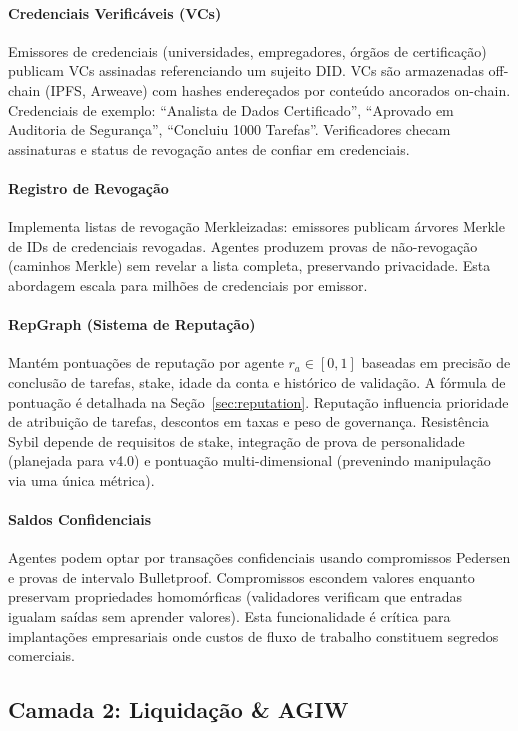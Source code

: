 \documentclass[11pt]{article}
\begin{document}
\paragraph{Credenciais Verificáveis (VCs)} Emissores de credenciais (universidades, empregadores, órgãos de certificação) publicam VCs assinadas referenciando um sujeito DID. VCs são armazenadas off-chain (IPFS, Arweave) com hashes endereçados por conteúdo ancorados on-chain. Credenciais de exemplo: ``Analista de Dados Certificado'', ``Aprovado em Auditoria de Segurança'', ``Concluiu 1000 Tarefas''. Verificadores checam assinaturas e status de revogação antes de confiar em credenciais.

\paragraph{Registro de Revogação} Implementa listas de revogação Merkleizadas: emissores publicam árvores Merkle de IDs de credenciais revogadas. Agentes produzem provas de não-revogação (caminhos Merkle) sem revelar a lista completa, preservando privacidade. Esta abordagem escala para milhões de credenciais por emissor.

\paragraph{RepGraph (Sistema de Reputação)} Mantém pontuações de reputação por agente $r_a \in [0,1]$ baseadas em precisão de conclusão de tarefas, stake, idade da conta e histórico de validação. A fórmula de pontuação é detalhada na Seção~\ref{sec:reputation}. Reputação influencia prioridade de atribuição de tarefas, descontos em taxas e peso de governança. Resistência Sybil depende de requisitos de stake, integração de prova de personalidade (planejada para v4.0) e pontuação multi-dimensional (prevenindo manipulação via uma única métrica).

\paragraph{Saldos Confidenciais} Agentes podem optar por transações confidenciais usando compromissos Pedersen e provas de intervalo Bulletproof. Compromissos escondem valores enquanto preservam propriedades homomórficas (validadores verificam que entradas igualam saídas sem aprender valores). Esta funcionalidade é crítica para implantações empresariais onde custos de fluxo de trabalho constituem segredos comerciais.

\subsection{Camada 2: Liquidação \& AGIW}
\end{document}
